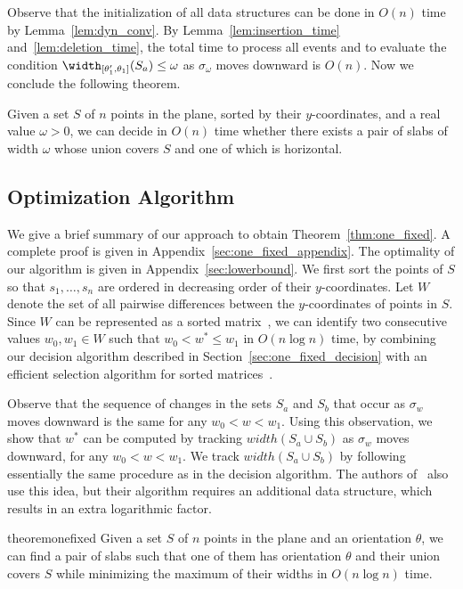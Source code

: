 Observe that the initialization of all data structures can be done in $O(n)$ time by Lemma~\ref{lem:dyn_conv}.
By Lemma~\ref{lem:insertion_time} and~\ref{lem:deletion_time}, the total time to process all events and to evaluate the condition $\width_{[\theta_1', \theta_1]}(S_a) \le \omega$ as $\sigma_\omega$ moves downward is $O(n)$. Now we conclude the following theorem.

\begin{theorem}
    \label{thm:one_fixed_decision}
    Given a set $S$ of $n$ points in the plane, sorted by their $y$-coordinates, and a real value $\omega > 0$, we can decide in $O(n)$ time whether there exists a pair of slabs of width $\omega$ whose union covers $S$ and one of which is horizontal.
\end{theorem}


\subsection{Optimization Algorithm}
\label{sec:one_fixed_optimization}

We give a brief summary of our approach to obtain Theorem~\ref{thm:one_fixed}. A complete proof is given in Appendix~\ref{sec:one_fixed_appendix}. The optimality of our algorithm is given in Appendix~\ref{sec:lowerbound}.
We first sort the points of $S$ so that $s_1, \ldots, s_n$ are ordered in decreasing order of their $y$-coordinates.
Let $W$ denote the set of all pairwise differences between the $y$-coordinates of points in $S$.
Since $W$ can be represented as a sorted matrix~\cite{frederickson1982complexity}, we can identify two consecutive values $w_0, w_1 \in W$ such that $w_0 < w^* \le w_1$ in $O(n \log n)$ time, by combining our decision algorithm described in Section~\ref{sec:one_fixed_decision} with an efficient selection algorithm for sorted matrices~\cite{frederickson1984generalized}.

Observe that the sequence of changes in the sets $S_a$ and $S_b$ that occur as $\sigma_w$ moves downward is the same for any $w_0 <w<w_1$.
Using this observation, we show that $w^*$ can be computed by tracking ${width}(S_a \cup S_b)$ as $\sigma_w$ moves downward, for any $w_0 < w < w_1$. 
We track ${width}(S_a \cup S_b)$ by following essentially the same procedure as in the decision algorithm. 
The authors of~\cite{ahn2024constrained} also use this idea, but their algorithm requires an additional data structure, which results in an extra logarithmic factor.


\begin{restatable}{theorem}{onefixed}
    \label{thm:one_fixed}
    Given a set $S$ of $n$ points in the plane and an orientation $\theta$, we can find a pair of slabs such that one of them has orientation $\theta$ and their union covers $S$ while minimizing the maximum of their widths in $O(n\log n)$ time.
\end{restatable}


